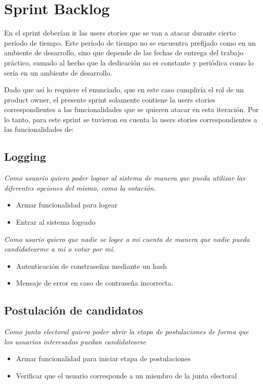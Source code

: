 \section{Sprint Backlog}

En el sprint deber\'ian ir las users stories que se van a atacar durante cierto per\'iodo de tiempo. 
Este per\'iodo de tiempo no se encuentra prefijado como en un ambiente de desarrollo, sino que depende de las fechas de entrega del trabajo pr\'actico, sumado al hecho que la dedicaci\'on no es constante y peri\'odica como lo ser\'ia en un ambiente de desarrollo.

\bigskip

Dado que as\'i lo requiere el enunciado, que en este caso cumplir\'ia el rol de un product owner, el presente sprint solamente contiene la users stories correspondientes a las funcionalidades que se quieren atacar en esta iteraci\'on. Por lo tanto, para este sprint se tuvieron en cuenta la users stories correspondientes a las funcionalidades de:

\bigskip

\subsection*{Logging}

\textsl{Como usuario quiero poder logear al sistema de manera que pueda utilizar las diferentes opciones del mismo, como la votaci\'on.}
\begin{itemize}
 \item Armar funcionalidad para logear
 \item Entrar al sistema logeado
\end{itemize}

\medskip

\textsl{Como usario quiero que nadie se logee a mi cuenta de manera que nadie pueda candidatearme a mi o votar por mi.}
\begin{itemize}
 \item Autenticaci\'on de constrase\~nas mediante un hash
 \item Mensaje de error en caso de contrase\~na incorrecta.
\end{itemize}
\bigskip

\subsection*{Postulaci\'on de candidatos}

\textsl{Como junta electoral quiero poder abrir la etapa de postulaciones de forma que los usuarios interesados puedan candidatearse}
\begin{itemize}
 \item Armar funcionalidad para iniciar etapa de postulaciones
 \item Verificar que el usuario corresponde a un miembro de la junta electoral
\end{itemize}

